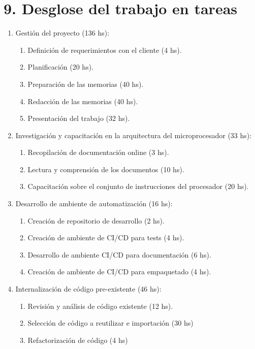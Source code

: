 \section{9. Desglose del trabajo en tareas}
\label{sec:9-desglose-del-trabajo-en-tareas}

\begin{enumerate}
\item Gestión del proyecto (136 hs):

  \begin{enumerate}
  \item Definición de requerimientos con el cliente (4 hs).
  \item Planificación (20 hs).
  \item Preparación de las memorias (40 hs).
  \item Redacción de las memorias (40 hs).
  \item Presentación del trabajo (32 hs).
  \end{enumerate}

\item Investigación y capacitación en la arquitectura del microprocesador (33 hs):

  \begin{enumerate}
  \item Recopilación de documentación online (3 hs).
  \item Lectura y comprensión de los documentos (10 hs).
  \item Capacitación sobre el conjunto de instrucciones del procesador (20 hs).
  \end{enumerate}

\item Desarrollo de ambiente de automatización (16 hs):

  \begin{enumerate}
  \item Creación de repositorio de desarrollo (2 hs).
  \item Creación de ambiente de CI/CD para tests (4 hs).
  \item Desarrollo  de ambiente CI/CD para documentación (6 hs).
  \item Creación de ambiente de CI/CD para empaquetado (4 hs).
  \end{enumerate}

\item Internalización de código pre-existente (46 hs):

  \begin{enumerate}
  \item Revisión y análisis de código existente (12 hs).
  \item Selección de código a reutilizar e importación (30 hs)
  \item Refactorización de código (4 hs)
  \end{enumerate}


\end{enumerate}
